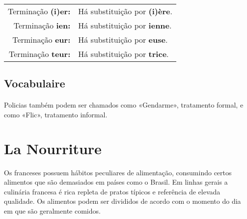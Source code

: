 \documentclass{article}
\begin{document}
        \begin{center}
            \begin{tabular}{r l}
                Terminação \textbf{(i)er:} & Há substituição por \textbf{(i)ère}.\\
                Terminação \textbf{ien:}   & Há substituição por \textbf{ienne}.\\
                Terminação \textbf{eur:}   & Há substituição por \textbf{euse}.\\
                Terminação \textbf{teur:}  & Há substituição por \textbf{trice}.\\
            \end{tabular}
        \end{center} 
        
    \subsection{Vocabulaire}
        \paragraph{}Policias também podem ser chamados como «Gendarme», tratamento formal, e como «Flic», tratamento informal.
\newpage

\section{La Nourriture}
    \paragraph{}Os franceses possuem hábitos peculiares de alimentação, consumindo certos alimentos que são demasiados em países como o Brasil. Em linhas gerais a culinária francesa é rica repleta de pratos típicos e referência de elevada qualidade. Os alimentos podem ser divididos de acordo com o momento do dia em que são geralmente comidos.
\end{document}
